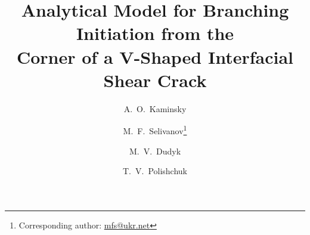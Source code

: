 \title{\textbf{Analytical Model for Branching Initiation from the\\
Corner of a V-Shaped Interfacial Shear Crack}}

\author[1]{A.~O.~Kaminsky}
\author[1]{M.~F.~Selivanov\thanks{Corresponding author: \href{mailto:mfs@ukr.net}{mfs@ukr.net}}}
\author[1,2]{M.~V.~Dudyk}
\author[2]{T.~V.~Polishchuk}


\date{}
